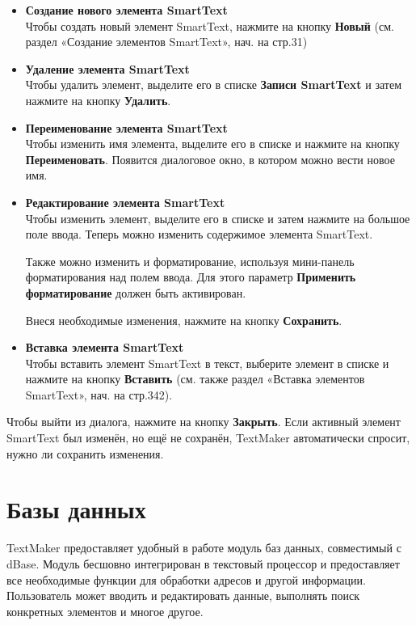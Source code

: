 ﻿\documentclass[a4paper,10pt]{article}
\begin{document}
\begin{itemize}
 \item \textbf{Создание нового элемента SmartText}\\
 Чтобы создать новый элемент SmartText, нажмите на кнопку \textbf{Новый} (см. раздел «Создание элементов SmartText», нач. на стр.31)
 \item \textbf{Удаление элемента SmartText}\\
 Чтобы удалить элемент, выделите его в списке \textbf{Записи SmartText} и затем нажмите на кнопку \textbf{Удалить}.
 \item \textbf{Переименование элемента SmartText}\\
 Чтобы изменить имя элемента, выделите его в списке и нажмите на кнопку \textbf{Переименовать}. Появится диалоговое окно, в котором можно вести новое имя.
 \item \textbf{Редактирование элемента SmartText}\\
 Чтобы изменить элемент, выделите его в списке и затем нажмите на большое поле ввода. Теперь можно изменить содержимое элемента SmartText.
 
 Также можно изменить и форматирование, используя мини-панель форматирования над полем ввода. Для этого параметр \textbf{Применить форматирование} должен быть активирован.
 
 Внеся необходимые изменения, нажмите на кнопку \textbf{Сохранить}.
 \item \textbf{Вставка элемента SmartText}\\
 Чтобы вставить элемент SmartText в текст, выберите элемент в списке и нажмите на кнопку \textbf{Вставить} (см. также раздел «Вставка элементов SmartText», нач. на стр.342).
\end{itemize}

Чтобы выйти из диалога, нажмите на кнопку \textbf{Закрыть}. Если активный элемент SmartText был изменён, но ещё не сохранён, TextMaker автоматически спросит, нужно ли сохранить изменения.

\section{Базы данных} \label{sec:базыданных}
TextMaker предоставляет удобный в работе модуль баз данных, совместимый с dBase. Модуль бесшовно интегрирован в текстовый процессор и предоставляет все необходимые функции для обработки адресов и другой информации. Пользователь может вводить и редактировать данные, выполнять поиск конкретных элементов и многое другое.
\end{document}
